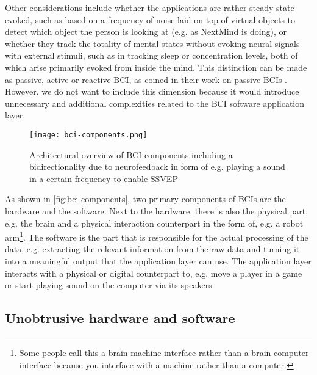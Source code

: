 Other considerations include whether the applications are rather steady-state evoked, such as based on a frequency of noise laid on top of virtual objects to detect which object the person is looking at (e.g. as NextMind is doing), or whether they track the totality of mental states without evoking neural signals with external stimuli, such as in tracking sleep or concentration levels, both of which arise primarily evoked from inside the mind. This distinction can be made as passive, active or reactive BCI, as \citeauthor{alimardani_passive_2020} coined in their work on passive BCIs \citep{alimardani_passive_2020}. However, we do not want to include this dimension because it would introduce unnecessary and additional complexities related to the BCI software application layer.

\begin{figure}[!ht]
  \centering
  \texttt{[image: bci-components.png]}
  \caption{Architectural overview of BCI components including a bidirectionality due to neurofeedback in form of e.g. playing a sound in a certain frequency to enable SSVEP}
  \label{fig:bci-components}
\end{figure}

As shown in \autoref{fig:bci-components}, two primary components of BCIs are the hardware and the software. Next to the hardware, there is also the physical part, e.g. the brain and a physical interaction counterpart in the form of, e.g. a robot arm\footnote{Some people call this a brain-machine interface rather than a brain-computer interface because you interface with a machine rather than a computer.}. The software is the part that is responsible for the actual processing of the data, e.g. extracting the relevant information from the raw data and turning it into a meaningful output that the application layer can use. The application layer interacts with a physical or digital counterpart to, e.g. move a player in a game or start playing sound on the computer via its speakers.

\subsection{Unobtrusive hardware and software}
\label{chapter2-unobtrusive-hardware-and-software}

